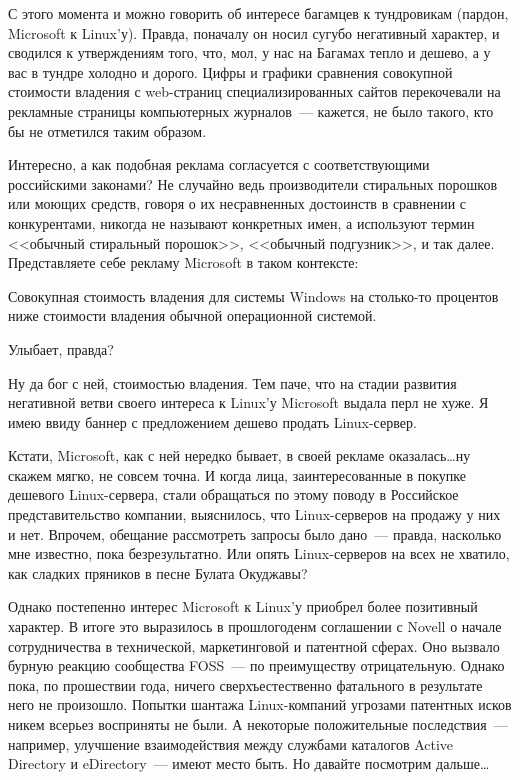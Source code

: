 С этого момента и можно говорить об интересе багамцев к тундровикам (пардон, Microsoft к Linux'у). Правда, поначалу он носил сугубо негативный характер, и сводился к утверждениям того, что, мол, у нас на Багамах тепло и дешево, а у вас в тундре холодно и дорого. Цифры и графики сравнения совокупной стоимости владения с web-страниц специализированных сайтов перекочевали на рекламные страницы компьютерных журналов~--- кажется, не было такого, кто бы не отметился таким образом.

Интересно, а как подобная реклама согласуется с соответствующими российскими законами? Не случайно ведь производители стиральных порошков или моющих средств, говоря о их несравненных достоинств в сравнении с конкурентами, никогда не называют конкретных имен, а используют термин <<обычный стиральный порошок>>, <<обычный подгузник>>, и так далее. Представляете себе рекламу Microsoft в таком контексте:


\begin{shadequote}{}
Совокупная стоимость владения для системы Windows на столько-то процентов ниже стоимости владения обычной операционной системой.
\end{shadequote}

Улыбает, правда?

Ну да бог с ней, стоимостью владения. Тем паче, что на стадии развития негативной ветви своего интереса к Linux'у Microsoft выдала перл не хуже. Я имею ввиду баннер с предложением дешево продать Linux-сервер.

Кстати, Microsoft, как с ней нередко бывает, в своей рекламе оказалась\dots ну скажем мягко, не совсем точна. И когда лица, заинтересованные в покупке дешевого Linux-сервера, стали обращаться по этому поводу в Российское представительство компании, выяснилось, что Linux-серверов на продажу у них и нет. Впрочем, обещание рассмотреть запросы было дано~--- правда, насколько мне известно, пока безрезультатно. Или опять Linux-серверов на всех не хватило, как сладких пряников в песне Булата Окуджавы?

Однако постепенно интерес Microsoft к Linux'у приобрел более позитивный характер. В итоге это выразилось в прошлогоденм соглашении с Novell о начале сотрудничества в технической, маркетинговой и патентной сферах. Оно вызвало бурную реакцию сообщества FOSS~--- по преимуществу отрицательную. Однако пока, по прошествии года, ничего сверхъестественно фатального в результате него не произошло. Попытки шантажа Linux-компаний угрозами патентных исков никем всерьез восприняты не были. А некоторые положительные последствия~--- например, улучшение взаимодействия между службами каталогов Active Directory и eDirectory~--- имеют место быть. Но давайте посмотрим дальше\dots

